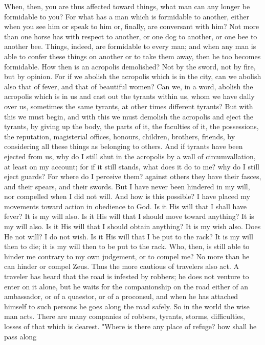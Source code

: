 \documentclass[a4paper]{article}
\begin{document}
    When, then, you are thus affected toward things, what man can any longer be
formidable to you? For what has a man which is formidable to another, either
when you see him or speak to him or, finally, are conversant with him? Not more
than one horse has with respect to another, or one dog to another, or one bee
to another bee. Things, indeed, are formidable to every man; and when any man
is able to confer these things on another or to take them away, then he too
becomes formidable. How then is an acropolis demolished? Not by the sword, not
by fire, but by opinion. For if we abolish the acropolis which is in the city,
can we abolish also that of fever, and that of beautiful women? Can we, in a
word, abolish the acropolis which is in us and cast out the tyrants within us,
whom we have dally over us, sometimes the same tyrants, at other times
different tyrants? But with this we must begin, and with this we must demolish
the acropolis and eject the tyrants, by giving up the body, the parts of it,
the faculties of it, the possessions, the reputation, magisterial offices,
honours, children, brothers, friends, by considering all these things as
belonging to others. And if tyrants have been ejected from us, why do I still
shut in the acropolis by a wall of circumvallation, at least on my account; for
if it still stands, what does it do to me? why do I still eject guards? For
where do I perceive them? against others they have their fasces, and their
spears, and their swords. But I have never been hindered in my will, nor
compelled when I did not will. And how is this possible? I have placed my
movements toward action in obedience to God. Is it His will that I shall have
fever? It is my will also. Is it His will that I should move toward anything?
It is my will also. Is it His will that I should obtain anything? It is my wish
also. Does He not will? I do not wish. Is it His will that I be put to the
rack? It is my will then to die; it is my will then to be put to the rack. Who,
then, is still able to hinder me contrary to my own judgement, or to compel me?
No more than he can hinder or compel Zeus.
    Thus the more cautious of travelers also act. A traveler has heard that the
road is infested by robbers; he does not venture to enter on it alone, but he
waits for the companionship on the road either of an ambassador, or of a
quaestor, or of a proconsul, and when he has attached himself to such persons
he goes along the road safely. So in the world the wise man acts. There are
many companies of robbers, tyrants, storms, difficulties, losses of that which
is dearest. "Where is there any place of refuge? how shall he pass along
\end{document}
